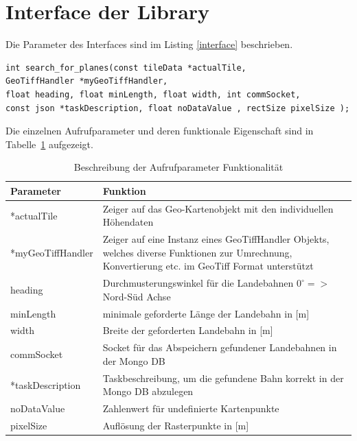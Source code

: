 \documentclass[10pt,a4paper]{report}
\begin{document}
\section{Interface der Library}

Die Parameter des Interfaces sind im Listing \ref{interface} beschrieben.

\begin{lstlisting}[caption=Interface Beschreibung, label=interface]
int search_for_planes(const tileData *actualTile, 
GeoTiffHandler *myGeoTiffHandler, 
float heading, float minLength, float width, int commSocket,
const json *taskDescription, float noDataValue , rectSize pixelSize );
\end{lstlisting}

Die einzelnen Aufrufparameter und deren funktionale Eigenschaft sind in Tabelle~\ref{beschreibungparameter} aufgezeigt.

\begin{table}[htb]
\centering
\begin{tabular}{|p{4.5cm}|p{10cm}|}
\hline 
\bf{Parameter} & \bf{Funktion} \\ 
\hline 
*actualTile & Zeiger auf das Geo-Kartenobjekt mit den individuellen Höhendaten \\ 
\hline 
*myGeoTiffHandler & Zeiger auf eine Instanz eines GeoTiffHandler Objekts, 
welches diverse Funktionen zur Umrechnung, Konvertierung etc. im GeoTiff Format unterstützt \\ 
\hline 
heading & Durchmusterungswinkel für die Landebahnen $0^\circ =>$ Nord-Süd Achse \\ 
\hline 
minLength & minimale geforderte Länge der Landebahn in [m] \\ 
\hline 
width & Breite der geforderten Landebahn in [m] \\ 
\hline 
commSocket & Socket für das Abspeichern gefundener Landebahnen in der Mongo DB\\ 
\hline 
*taskDescription & Taskbeschreibung, um die gefundene Bahn korrekt in der Mongo DB abzulegen \\ 
\hline 
noDataValue & Zahlenwert für undefinierte Kartenpunkte \\ 
\hline 
pixelSize & Auflösung der Rasterpunkte in [m]\\
\hline 

\end{tabular} 
\caption{Beschreibung der Aufrufparameter Funktionalität}\label{beschreibungparameter}
\end{table}
\end{document}
